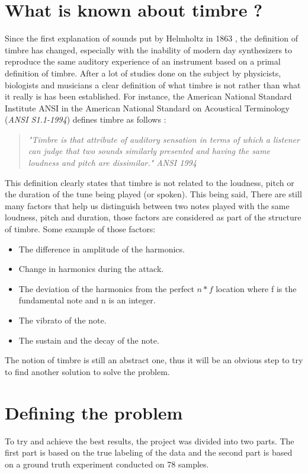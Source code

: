 \documentclass[hidelinks,12pt]{report}
\begin{document}
\section{What is known about timbre ?}
Since the first explanation of sounds put by Helmholtz in 1863 \cite{H95}, the definition of timbre has changed, especially with the inability of modern day synthesizers to reproduce the same auditory experience of an instrument based on a primal definition of timbre. After a lot of studies done on the subject by physicists, biologists and musicians a clear definition of what timbre is not rather than what it really is has been established. For instance, the American National Standard Institute ANSI in the American National Standard on Acoustical Terminology (\textit{ANSI S1.1-1994}) defines timbre as follows :
\begin{quote}
\textit{"Timbre is that attribute of auditory sensation in terms of which a listener can judge that two sounds similarly presented and having the same loudness and pitch are dissimilar." ANSI 1994}
\end{quote}
This definition clearly states that timbre is not related to the loudness, pitch or the duration of the tune being played (or spoken). This being said, There are still many factors that help us distinguish between two notes played with the same loudness, pitch and duration, those factors are considered as part of the structure of timbre. Some example of those factors:
\begin{itemize}
\item The difference in amplitude of the harmonics.
\item Change in harmonics during the attack.
\item The deviation of the harmonics from the perfect $n*f$ location where f is the fundamental note and n is an integer.
\item The vibrato of the note.
\item The sustain and the decay of the note. 
\end{itemize}
The notion of timbre is still an abstract one, thus it will be an obvious step to try to find another solution to solve the problem.
\section{Defining the problem}
To try and achieve the best results, the project was divided into two parts. The first part is based on the true labeling of the data and the second part is based on a ground truth experiment conducted on 78 samples.
\end{document}
